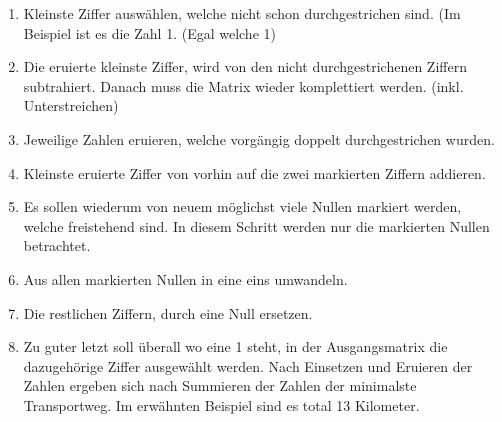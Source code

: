 \begin{enumerate}
\item Kleinste Ziffer auswählen, welche nicht schon durchgestrichen sind.
(Im Beispiel ist es die Zahl 1. (Egal welche 1)

\item Die eruierte kleinste Ziffer, wird von den nicht durchgestrichenen Ziffern
subtrahiert. Danach muss die Matrix wieder komplettiert werden. (inkl. Unterstreichen)

\item Jeweilige Zahlen eruieren, welche vorgängig doppelt durchgestrichen wurden.

\item Kleinste eruierte Ziffer von vorhin auf die zwei markierten Ziffern addieren.

\item Es sollen wiederum von neuem möglichst viele Nullen markiert werden,
welche freistehend sind. In diesem Schritt werden nur die markierten Nullen betrachtet.

\item Aus allen markierten Nullen in eine eins umwandeln.

\item Die restlichen Ziffern, durch eine Null ersetzen.

\item Zu guter letzt soll überall wo eine 1 steht, in der Ausgangsmatrix die
dazugehörige Ziffer ausgewählt werden. Nach Einsetzen und Eruieren der Zahlen ergeben sich nach Summieren der Zahlen der minimalste Transportweg. Im erwähnten Beispiel sind es total 13 Kilometer.
\end{enumerate}

